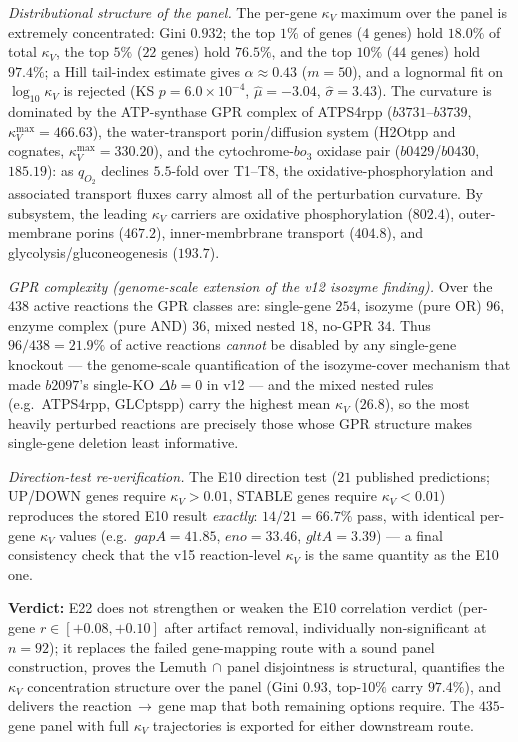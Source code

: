 \documentclass[11pt,a4paper]{article}
\theoremstyle{plain}
\theoremstyle{definition}
\theoremstyle{remark}
\begin{document}
\emph{Distributional structure of the panel.} The per-gene
$\kappa_V$ maximum over the panel is extremely concentrated: Gini
$0.932$; the top $1\%$ of genes ($4$ genes) hold $18.0\%$ of total
$\kappa_V$, the top $5\%$ ($22$ genes) hold $76.5\%$, and the top
$10\%$ ($44$ genes) hold $97.4\%$; a Hill tail-index estimate gives
$\alpha \approx 0.43$ ($m = 50$), and a lognormal fit on
$\log_{10}\kappa_V$ is rejected (KS $p = 6.0 \times 10^{-4}$,
$\hat\mu = -3.04$, $\hat\sigma = 3.43$). The curvature is dominated by
the ATP-synthase GPR complex of ATPS4rpp ($b3731$--$b3739$,
$\kappa_V^{\max} = 466.63$), the water-transport porin/diffusion
system (H2Otpp and cognates, $\kappa_V^{\max} = 330.20$), and the
cytochrome-$bo_3$ oxidase pair ($b0429$/$b0430$, $185.19$):
as $q_{O_2}$ declines $5.5$-fold over T1--T8, the
oxidative-phosphorylation and associated transport fluxes carry
almost all of the perturbation curvature. By subsystem, the leading
$\kappa_V$ carriers are oxidative phosphorylation ($802.4$),
outer-membrane porins ($467.2$), inner-membrbrane transport
($404.8$), and glycolysis/gluconeogenesis ($193.7$).

\emph{GPR complexity (genome-scale extension of the v12 isozyme
finding).} Over the $438$ active reactions the GPR classes are:
single-gene $254$, isozyme (pure OR) $96$, enzyme complex (pure AND)
$36$, mixed nested $18$, no-GPR $34$. Thus $96/438 = 21.9\%$ of
active reactions \emph{cannot} be disabled by any single-gene
knockout --- the genome-scale quantification of the isozyme-cover
mechanism that made $b2097$'s single-KO $\Delta b = 0$ in v12 ---
and the mixed nested rules (e.g.\ ATPS4rpp, GLCptspp) carry the
highest mean $\kappa_V$ ($26.8$), so the most heavily perturbed
reactions are precisely those whose GPR structure makes
single-gene deletion least informative.

\emph{Direction-test re-verification.} The E10 direction test
($21$ published predictions; UP/DOWN genes require
$\kappa_V > 0.01$, STABLE genes require $\kappa_V < 0.01$) reproduces
the stored E10 result \emph{exactly}: $14/21 = 66.7\%$ pass, with
identical per-gene $\kappa_V$ values (e.g.\ $\mathit{gapA} = 41.85$,
$\mathit{eno} = 33.46$, $\mathit{gltA} = 3.39$) --- a final
consistency check that the v15 reaction-level $\kappa_V$ is the same
quantity as the E10 one.

\textbf{Verdict:} E22 does not strengthen or weaken the E10
correlation verdict (per-gene $r \in [+0.08, +0.10]$ after artifact
removal, individually non-significant at $n=92$); it replaces the
failed gene-mapping route with a sound panel construction, proves
the Lemuth$\,\cap\,$panel disjointness is structural, quantifies the
$\kappa_V$ concentration structure over the panel (Gini $0.93$,
top-$10\%$ carry $97.4\%$), and delivers the
reaction$\,\to\,$gene map that both remaining options require.
The $435$-gene panel with full $\kappa_V$ trajectories is exported
for either downstream route.
\end{document}
